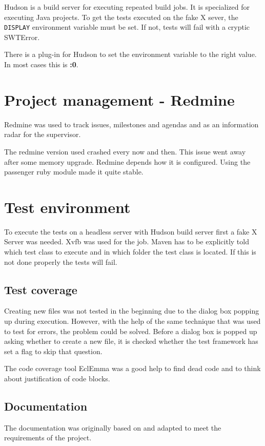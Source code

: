 Hudson is a build server for executing repeated build jobs. It is specialized
for executing Java projects. To get the tests executed on the fake X sever, the
\texttt{DISPLAY} environment variable must be set. If not, tests will fail with
a cryptic SWTError.

There is a plug-in for Hudson to set the environment variable to
the right value. In most cases this is \textbf{:0}.

\section{Project management - Redmine}

Redmine was used to track issues, milestones and agendas and as an information 
radar for the supervisor.

The redmine version used crashed every now and then. This issue went away after
some memory upgrade. Redmine depends how it is configured. Using the passenger
ruby module made it quite stable. 

\section{Test environment}

To execute the tests on a headless server with Hudson build server first a fake
X Server was needed. Xvfb was used for the job. Maven has to be
explicitly told which test class to execute and in which folder the test class
is located. If this is not done properly the tests will fail.

\subsection{Test coverage}

Creating new files was not tested in the beginning due to the dialog box popping 
up during execution. However, with the help of the same technique that was used 
to test for errors, the problem could be solved. Before a dialog box is popped 
up asking whether to create a new file, it is checked whether the test framework 
has set a flag to skip that question.

The code coverage tool EclEmma was a good help to find dead code and to think
about justification of code blocks.

\subsection{Documentation}

The documentation was originally based on \cite{AV08} and adapted to meet the 
requirements of the project.

